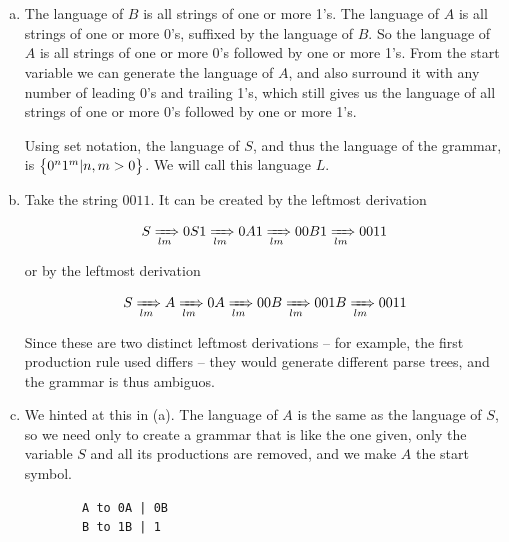 \documentclass{article}
\begin{document}
\newpage
\section{}

\begin{enumerate}[(a)]
    \item The language of $B$ is all strings of one or more 1's. The language of $A$ is all strings of one or more 0's, suffixed by the language of $B$. So the language of $A$ is all strings of one or more 0's followed by one or more 1's. From the start variable we can generate the language of $A$, and also surround it with any number of leading 0's and trailing 1's, which still gives us the language of all strings of one or more 0's followed by one or more 1's.
        
        Using set notation, the language of $S$, and thus the language of the grammar, is $\set{0^n1^m | n,m > 0}$. We will call this language $L$.

    \item Take the string $0011$. It can be created by the leftmost derivation

        \begin{align*}
            S \xRightarrow[lm]{} 0S1 \xRightarrow[lm]{} 0A1 \xRightarrow[lm]{} 00B1 \xRightarrow[lm]{} 0011
        \end{align*}

        or by the leftmost derivation 

        \begin{align*}
            S \xRightarrow[lm]{} A \xRightarrow[lm]{} 0A \xRightarrow[lm]{} 00B \xRightarrow[lm]{} 001B \xRightarrow[lm]{} 0011
        \end{align*}

        Since these are two distinct leftmost derivations – for example, the first production rule used differs – they would generate different parse trees, and the grammar is thus ambiguos.

    \item
        We hinted at this in (a). The language of $A$ is the same as the language of $S$, so we need only to create a grammar that is like the one given, only the variable $S$ and all its productions are removed, and we make $A$ the start symbol.

        \begin{lstlisting}
        A to 0A | 0B 
        B to 1B | 1 
        \end{lstlisting}


\end{enumerate}
\end{document}
